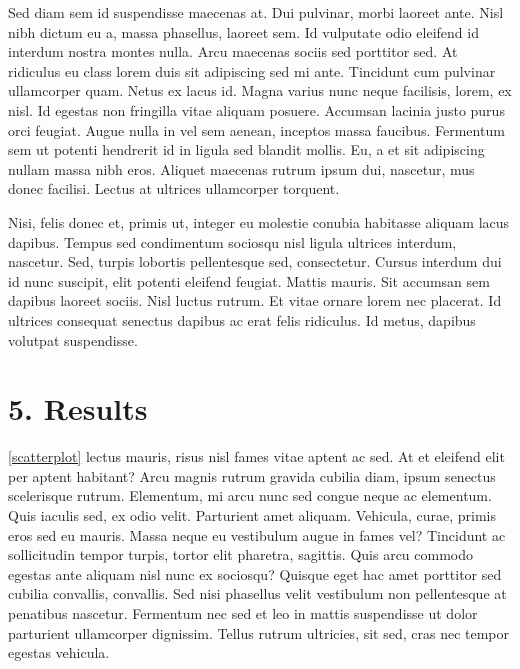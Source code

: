 \documentclass[
]{article}
\begin{document}
Sed diam sem id suspendisse maecenas at. Dui pulvinar, morbi laoreet
ante. Nisl nibh dictum eu a, massa phasellus, laoreet sem. Id vulputate
odio eleifend id interdum nostra montes nulla. Arcu maecenas sociis sed
porttitor sed. At ridiculus eu class lorem duis sit adipiscing sed mi
ante. Tincidunt cum pulvinar ullamcorper quam. Netus ex lacus id. Magna
varius nunc neque facilisis, lorem, ex nisl. Id egestas non fringilla
vitae aliquam posuere. Accumsan lacinia justo purus orci feugiat. Augue
nulla in vel sem aenean, inceptos massa faucibus. Fermentum sem ut
potenti hendrerit id in ligula sed blandit mollis. Eu, a et sit
adipiscing nullam massa nibh eros. Aliquet maecenas rutrum ipsum dui,
nascetur, mus donec facilisi. Lectus at ultrices ullamcorper torquent.

Nisi, felis donec et, primis ut, integer eu molestie conubia habitasse
aliquam lacus dapibus. Tempus sed condimentum sociosqu nisl ligula
ultrices interdum, nascetur. Sed, turpis lobortis pellentesque sed,
consectetur. Cursus interdum dui id nunc suscipit, elit potenti eleifend
feugiat. Mattis mauris. Sit accumsan sem dapibus laoreet sociis. Nisl
luctus rutrum. Et vitae ornare lorem nec placerat. Id ultrices consequat
senectus dapibus ac erat felis ridiculus. Id metus, dapibus volutpat
suspendisse.

\hypertarget{results}{%
\section{5. Results}\label{results}}

\autoref{scatterplot} lectus mauris, risus nisl fames vitae aptent ac
sed. At et eleifend elit per aptent habitant? Arcu magnis rutrum gravida
cubilia diam, ipsum senectus scelerisque rutrum. Elementum, mi arcu nunc
sed congue neque ac elementum. Quis iaculis sed, ex odio velit.
Parturient amet aliquam. Vehicula, curae, primis eros sed eu mauris.
Massa neque eu vestibulum augue in fames vel? Tincidunt ac sollicitudin
tempor turpis, tortor elit pharetra, sagittis. Quis arcu commodo egestas
ante aliquam nisl nunc ex sociosqu? Quisque eget hac amet porttitor sed
cubilia convallis, convallis. Sed nisi phasellus velit vestibulum non
pellentesque at penatibus nascetur. Fermentum nec sed et leo in mattis
suspendisse ut dolor parturient ullamcorper dignissim. Tellus rutrum
ultricies, sit sed, cras nec tempor egestas vehicula.
\end{document}
